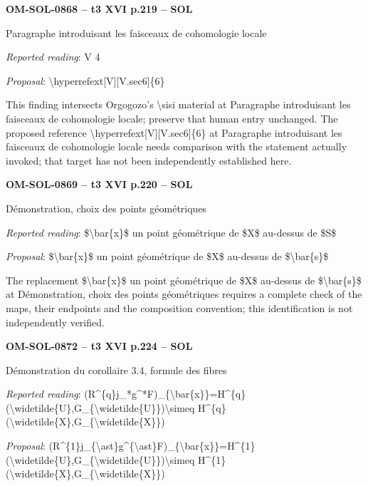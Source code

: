 \par\noindent\textbf{OM-SOL-0868 -- t3 XVI p.219 -- SOL}\par
Paragraphe introduisant les faisceaux de cohomologie locale\par
\emph{Reported reading}: V 4\par
\emph{Proposal}: \textbackslash{}hyperrefext[V][V.sec6]\{6\}\par
This finding intersects Orgogozo's \textbackslash{}sisi material at Paragraphe introduisant les faisceaux de cohomologie locale; preserve that human entry unchanged. The proposed reference \textbackslash{}hyperrefext[V][V.sec6]\{6\} at Paragraphe introduisant les faisceaux de cohomologie locale needs comparison with the statement actually invoked; that target has not been independently established here.\par
\par\noindent\textbf{OM-SOL-0869 -- t3 XVI p.220 -- SOL}\par
Démonstration, choix des points géométriques\par
\emph{Reported reading}: \$\textbackslash{}bar\{x\}\$ un point géométrique de \$X\$ au-dessus de \$S\$\par
\emph{Proposal}: \$\textbackslash{}bar\{x\}\$ un point géométrique de \$X\$ au-dessus de \$\textbackslash{}bar\{s\}\$\par
The replacement \$\textbackslash{}bar\{x\}\$ un point géométrique de \$X\$ au-dessus de \$\textbackslash{}bar\{s\}\$ at Démonstration, choix des points géométriques requires a complete check of the maps, their endpoints and the composition convention; this identification is not independently verified.\par
\par\noindent\textbf{OM-SOL-0872 -- t3 XVI p.224 -- SOL}\par
Démonstration du corollaire 3.4, formule des fibres\par
\emph{Reported reading}: (R\textasciicircum{}\{q\}j\_*g\textasciicircum{}*F)\_\{\textbackslash{}bar\{x\}\}=\allowbreak H\textasciicircum{}\{q\}(\textbackslash{}widetilde\{U\},G\_\{\textbackslash{}widetilde\{U\}\})\textbackslash{}simeq H\textasciicircum{}\{q\}(\textbackslash{}widetilde\{X\},G\_\{\textbackslash{}widetilde\{X\}\})\par
\emph{Proposal}: (R\textasciicircum{}\{1\}j\_\{\textbackslash{}ast\}g\textasciicircum{}\{\textbackslash{}ast\}F)\_\{\textbackslash{}bar\{x\}\}=\allowbreak H\textasciicircum{}\{1\}(\textbackslash{}widetilde\{U\},G\_\{\textbackslash{}widetilde\{U\}\})\textbackslash{}simeq H\textasciicircum{}\{1\}(\textbackslash{}widetilde\{X\},G\_\{\textbackslash{}widetilde\{X\}\})\par
